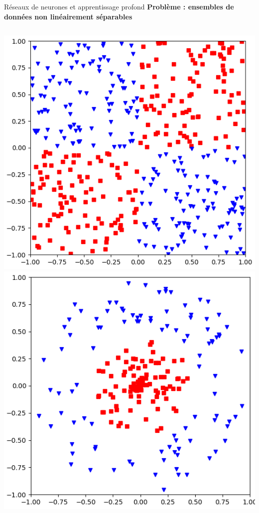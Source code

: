 \documentclass[french]{beamer}
\begin{document}
\begin{frame}{Réseaux de neurones et apprentissage profond}
\textbf{Problème : ensembles de données non linéairement séparables}
\vspace{-.5cm}
\begin{columns}[T]
\hfill
\begin{column}{.3\textwidth}
\begin{center}
\includegraphics[width=\linewidth]{figures/xor} \\
\includegraphics[width=\linewidth]{figures/circle}

\end{center}
\end{column}
\end{columns}
\end{frame}
\end{document}
